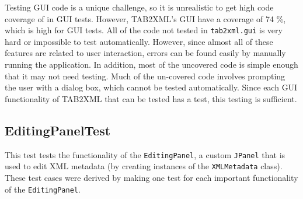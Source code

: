 \documentclass[11pt]{article}
\begin{document}
Testing GUI code is a unique challenge, so it is unrealistic to get high code coverage of in GUI tests.  However, TAB2XML's GUI have a coverage of 74 \%, which is high for GUI tests.  All of the code not tested in \texttt{tab2xml.gui} is very hard or impossible to test automatically.  However, since almost all of these features are related to user interaction, errors can be found easily by manually running the application.  In addition, most of the uncovered code is simple enough that it may not need testing.  Much of the un-covered code involves prompting the user with a dialog box, which cannot be tested automatically.  Since each GUI functionality of TAB2XML that can be tested has a test, this testing is sufficient.
\subsection{EditingPanelTest}
\label{sec:org117b3d6}
This test tests the functionality of the \texttt{EditingPanel}, a custom \texttt{JPanel} that is used to edit XML metadata (by creating instances of the \texttt{XMLMetadata} class).  These test cases were derived by making one test for each important functionality of the \texttt{EditingPanel}.
\end{document}
